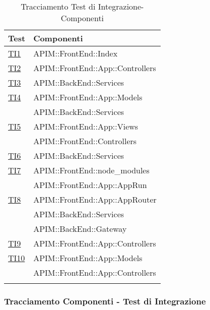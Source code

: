 \normalsize
\begin{longtable}{|>{\centering}m{5cm}|m{7cm}<{\centering}|}
	\hline \rowcolor{Gray}
	\textbf{Test} & \textbf{Componenti}\\
	\hline
	\endhead
	\hyperlink{TI1}{TI1} & APIM::FrontEnd::Index \\ \hline
	\hyperlink{TI2}{TI2} & APIM::FrontEnd::App::Controllers \\ \hline
	\hyperlink{TI3}{TI3} & APIM::BackEnd::Services \\ \hline
	\hyperlink{TI4}{TI4} & APIM::FrontEnd::App::Models\\&APIM::BackEnd::Services \\ \hline
	\hyperlink{TI5}{TI5} & APIM::FrontEnd::App::Views\\&APIM::FrontEnd::Controllers \\ \hline
	\hyperlink{TI6}{TI6} & APIM::BackEnd::Services \\ \hline
	\hyperlink{TI7}{TI7} & APIM::FrontEnd::node\_modules\\&APIM::FrontEnd::App::AppRun \\ \hline
	\hyperlink{TI8}{TI8} & APIM::FrontEnd::App::AppRouter\\&APIM::BackEnd::Services\\&APIM::BackEnd::Gateway \\ \hline
	\hyperlink{TI9}{TI9} & APIM::FrontEnd::App::Controllers \\ \hline
	\hyperlink{TI10}{TI10} & APIM::FrontEnd::App::Models\\&APIM::FrontEnd::App::Controllers \\ \hline
	
	\caption[Tracciamento Test di Integrazione-Componenti]{Tracciamento Test di Integrazione-Componenti}
	\label{tabella:ti-componenti}
\end{longtable}
\clearpage

\subsubsection{Tracciamento Componenti - Test di Integrazione}

